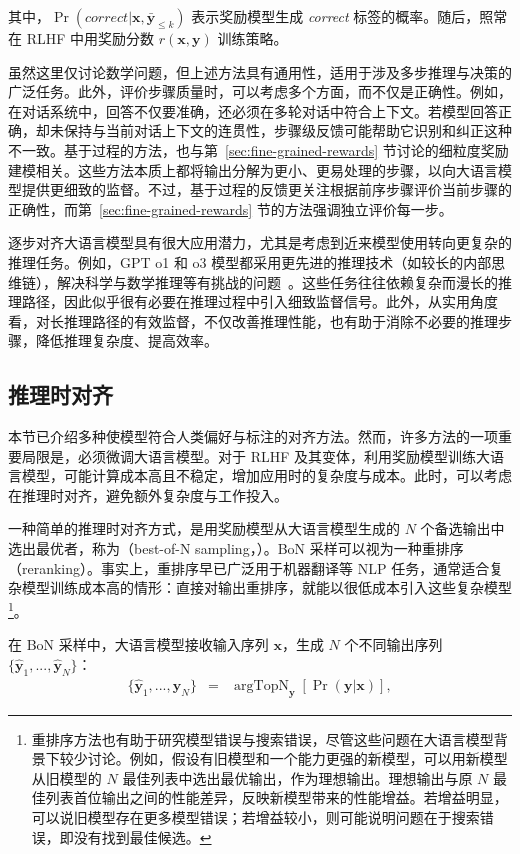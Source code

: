 \noindent 其中，$\Pr(\textit{correct}|\mathbf{x},\bar{\mathbf{y}}_{\le k})$ 表示奖励模型生成 \textit{correct} 标签的概率。随后，照常在 RLHF 中用奖励分数 $r(\mathbf{x},\mathbf{y})$ 训练策略。

虽然这里仅讨论数学问题，但上述方法具有通用性，适用于涉及多步推理与决策的广泛任务。此外，评价步骤质量时，可以考虑多个方面，而不仅是正确性。例如，在对话系统中，回答不仅要准确，还必须在多轮对话中符合上下文。若模型回答正确，却未保持与当前对话上下文的连贯性，步骤级反馈可能帮助它识别和纠正这种不一致。基于过程的方法，也与第~\ref{sec:fine-grained-rewards} 节讨论的细粒度奖励建模相关。这些方法本质上都将输出分解为更小、更易处理的步骤，以向大语言模型提供更细致的监督。不过，基于过程的反馈更关注根据前序步骤评价当前步骤的正确性，而第~\ref{sec:fine-grained-rewards} 节的方法强调独立评价每一步。

逐步对齐大语言模型具有很大应用潜力，尤其是考虑到近来模型使用转向更复杂的推理任务。例如，GPT o1 和 o3 模型都采用更先进的推理技术（如较长的内部思维链），解决科学与数学推理等有挑战的问题~\cite{openai:2024learning}。这些任务往往依赖复杂而漫长的推理路径，因此似乎很有必要在推理过程中引入细致监督信号。此外，从实用角度看，对长推理路径的有效监督，不仅改善推理性能，也有助于消除不必要的推理步骤，降低推理复杂度、提高效率。

\subsection{推理时对齐}

\noindent 本节已介绍多种使模型符合人类偏好与标注的对齐方法。然而，许多方法的一项重要局限是，必须微调大语言模型。对于 RLHF 及其变体，利用奖励模型训练大语言模型，可能计算成本高且不稳定，增加应用时的复杂度与成本。此时，可以考虑在推理时对齐，避免额外复杂度与工作投入。

一种简单的推理时对齐方式，是用奖励模型从大语言模型生成的 $N$ 个备选输出中选出最优者，称为（best-of-N sampling，）。BoN 采样可以视为一种重排序（reranking）。事实上，重排序早已广泛用于机器翻译等 NLP 任务，通常适合复杂模型训练成本高的情形：直接对输出重排序，就能以很低成本引入这些复杂模型\footnote{重排序方法也有助于研究模型错误与搜索错误，尽管这些问题在大语言模型背景下较少讨论。例如，假设有旧模型和一个能力更强的新模型，可以用新模型从旧模型的 $N$ 最佳列表中选出最优输出，作为理想输出。理想输出与原 $N$ 最佳列表首位输出之间的性能差异，反映新模型带来的性能增益。若增益明显，可以说旧模型存在更多模型错误；若增益较小，则可能说明问题在于搜索错误，即没有找到最佳候选。}。

在 BoN 采样中，大语言模型接收输入序列 $\mathbf{x}$，生成 $N$ 个不同输出序列 $\{\hat{\mathbf{y}}_1,...,\hat{\mathbf{y}}_N\}$：
\begin{eqnarray}
\{\hat{\mathbf{y}}_1,...,\hat{\mathbf{y}}_N\} & = & \mathop{\mathrm{argTopN}}_{\mathbf{y}} \left[ \Pr(\mathbf{y}|\mathbf{x}) \right],
\end{eqnarray}

